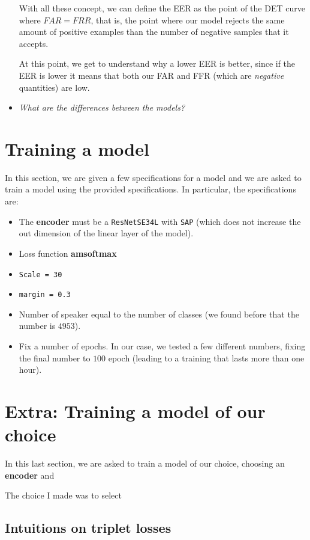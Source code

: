 \documentclass[a4paper]{article}
\def\inline{\lstinline[basicstyle=\ttfamily,keywordstyle={}]}
\begin{document}
\begin{itemize}
        With all these concept, we can define the EER as the point of the DET curve where \(FAR = FRR\), that is, the point where our model rejects the same amount of positive examples than the number of negative samples that it accepts.

        At this point, we get to understand why a lower EER is better, since if the EER is lower it means that both our FAR and FFR (which are \emph{negative} quantities) are low.
  \item \emph{What are the differences between the models?}\\



\end{itemize}


\section{Training a model}

In this section, we are given a few specifications for a model and we are asked to train a model using the provided specifications. In particular, the specifications are:

\begin{itemize}
  \item The \textbf{encoder} must be a \inline{ResNetSE34L} with \inline{SAP} (which does not increase the out dimension of the linear layer of the model).
  \item Loss function \textbf{amsoftmax}
  \item \inline{Scale = 30}
  \item \inline{margin = 0.3}
  \item Number of speaker equal to the number of classes (we found before that the number is \(4953\)).
        \item Fix a number of epochs. In our case, we tested a few different numbers, fixing the final number to \(100\) epoch (leading to a training that lasts more than one hour).
\end{itemize}


\section{Extra: Training a model of our choice}
In this last section, we are asked to train a model of our choice, choosing an \textbf{encoder} and

The choice I made was to select

\subsection{Intuitions on triplet losses}
\end{document}
